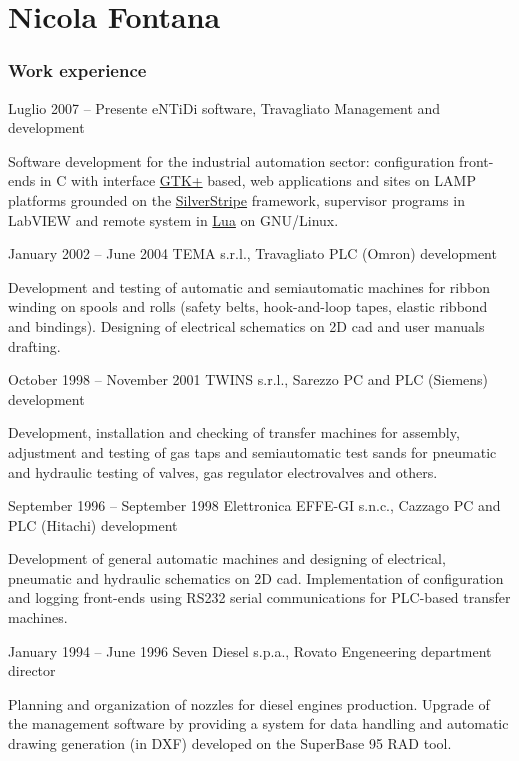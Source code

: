 \documentclass{tccv}
\begin{document}
\part{Nicola Fontana}

%
\begin{minipage}[t]{0.5\linewidth}
\vspace{0pt} %

\section{Work experience}

\begin{eventlist}

\item{Luglio 2007 -- Presente}
     {eNTiDi software, Travagliato}
     {Management and development}

Software development for the industrial automation sector: configuration
front-ends in C with interface \href{http://www.gtk.org/}{GTK+} based,
web applications and sites on LAMP platforms grounded on the
\href{http://www.silverstripe.org/}{SilverStripe} framework,
supervisor programs in LabVIEW and remote system in
\href{http://www.lua.org/}{Lua} on GNU/Linux.

\item{January 2002 -- June 2004}
     {TEMA s.r.l., Travagliato}
     {PLC (Omron) development}

Development and testing of automatic and semiautomatic machines for
ribbon winding on spools and rolls (safety belts, hook-and-loop tapes,
elastic ribbond and bindings). Designing of electrical schematics on
2D cad and user manuals drafting.

\item{October 1998 -- November 2001}
     {TWINS s.r.l., Sarezzo}
     {PC and PLC (Siemens) development}

Development, installation and checking of transfer machines for
assembly, adjustment and testing of gas taps and semiautomatic test
sands for pneumatic and hydraulic testing of valves, gas regulator
electrovalves and others.

\item{September 1996 -- September 1998}
     {Elettronica EFFE-GI s.n.c., Cazzago}
     {PC and PLC (Hitachi) development}

Development of general automatic machines and designing of electrical,
pneumatic and hydraulic schematics on 2D cad. Implementation of
configuration and logging front-ends using RS232 serial communications
for PLC-based transfer machines.

\item{January 1994 -- June 1996}
     {Seven Diesel s.p.a., Rovato}
     {Engeneering department director}

Planning and organization of nozzles for diesel engines production.
Upgrade of the management software by providing a system for data
handling and automatic drawing generation (in DXF) developed on the
SuperBase 95 RAD tool.

\end{eventlist}
\end{minipage}
\end{document}
